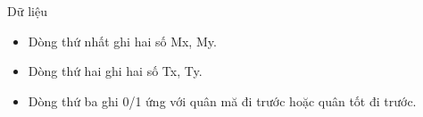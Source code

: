 Dữ liệu
\begin{itemize}
	\item     Dòng thứ nhất ghi hai số Mx, My.   
	\item     Dòng thứ hai ghi hai số Tx, Ty.   
	\item     Dòng thứ ba ghi 0/1 ứng với quân mă đi trước hoặc quân tốt đi trước.   
\end{itemize}